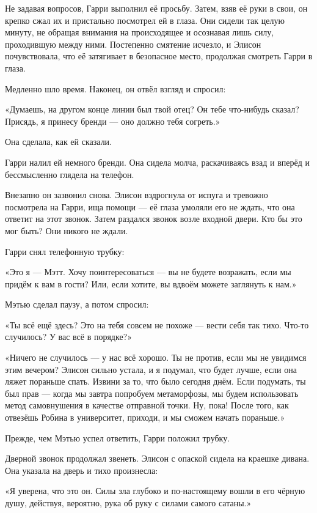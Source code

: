 \documentclass[a4paper,12pt]{book}
\begin{document}
\par
Не задавая вопросов, Гарри выполнил её просьбу. Затем, взяв её руки в свои, он крепко сжал их и пристально посмотрел ей в глаза. Они сидели так целую минуту, не обращая внимания на происходящее и осознавая лишь силу, проходившую между ними. Постепенно смятение исчезло, и Элисон почувствовала, что её затягивает в безопасное место, продолжая смотреть Гарри в глаза.
\par
Медленно шло время. Наконец, он отвёл взгляд и спросил:
\par
«Думаешь, на другом конце линии был твой отец? Он тебе что-нибудь сказал? Присядь, я принесу бренди — оно должно тебя согреть.»
\par
Она сделала, как ей сказали.
\par
Гарри налил ей немного бренди. Она сидела молча, раскачиваясь взад и вперёд и бессмысленно глядела на телефон.
\par
Внезапно он зазвонил снова. Элисон вздрогнула от испуга и тревожно посмотрела на Гарри, ища помощи — её глаза умоляли его не ждать, что она ответит на этот звонок. Затем раздался звонок возле входной двери. Кто бы это мог быть? Они никого не ждали.
\par
Гарри снял телефонную трубку:
\par
«Это я — Мэтт. Хочу поинтересоваться — вы не будете возражать, если мы придём к вам в гости? Или, если хотите, вы вдвоём можете заглянуть к нам.»
\par
Мэтью сделал паузу, а потом спросил:
\par
«Ты всё ещё здесь? Это на тебя совсем не похоже — вести себя так тихо. Что-то случилось? У вас всё в порядке?»
\par
«Ничего не случилось — у нас всё хорошо. Ты не против, если мы не увидимся этим вечером? Элисон сильно устала, и я подумал, что будет лучше, если она ляжет пораньше спать. Извини за то, что было сегодня днём. Если подумать, ты был прав — когда мы завтра попробуем метаморфозы, мы будем использовать метод самовнушения в качестве отправной точки. Ну, пока! После того, как отвезёшь Робина в университет, приходи, и мы сможем начать пораньше.»
\par
Прежде, чем Мэтью успел ответить, Гарри положил трубку.
\par
Дверной звонок продолжал звенеть. Элисон с опаской сидела на краешке дивана. Она указала на дверь и тихо произнесла:
\par
«Я уверена, что это он. Силы зла глубоко и по-настоящему вошли в его чёрную душу, действуя, вероятно, рука об руку с силами самого сатаны.»
\end{document}
